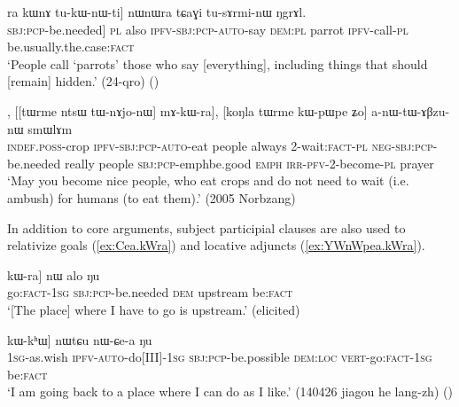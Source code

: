 \begin{exe}
\ex \label{ex:kAnWtsW.kWra}
\gll [kɤ-nɯtsɯ kɯ-ra] ra kɯnɤ tu-kɯ-nɯ-ti] nɯnɯra tɕaɣi tu-sɤrmi-nɯ ŋgrɤl. \\
[[[\textsc{inf}-hide] \textsc{sbj}:\textsc{pcp}-be.needed] \textsc{pl} also \textsc{ipfv}-\textsc{sbj}:\textsc{pcp}-\textsc{auto}-say \textsc{dem}:\textsc{pl} parrot \textsc{ipfv}-call-\textsc{pl} be.usually.the.case:\textsc{fact} \\
\glt `People call `parrots' those who say [everything], including things that should [remain] hidden.' (24-qro)
()
\end{exe}

\begin{exe}
\ex \label{ex:tWnAjonW.kWra}
, [[tɯrme ntsɯ tɯ-nɤjo-nɯ] mɤ-kɯ-ra], [koŋla tɯrme kɯ-pɯ\redp{}pe ʑo] a-nɯ-tɯ-ɤβzu-nɯ smɯlɤm \\
\textsc{indef}.\textsc{poss}-crop \textsc{ipfv}-\textsc{sbj}:\textsc{pcp}-\textsc{auto}-eat people always 2-wait:\textsc{fact}-\textsc{pl} \textsc{neg}-\textsc{sbj}:\textsc{pcp}-be.needed really people \textsc{sbj}:\textsc{pcp}-emph\redp{}be.good \textsc{emph} \textsc{irr}-\textsc{pfv}-2-become-\textsc{pl} prayer \\
\glt `May you become nice people, who eat crops and do not need to wait (i.e. ambush) for humans (to eat them).' (2005 Norbzang)
\end{exe}

In addition to core arguments, subject participial clauses are also used to relativize goals (\ref{ex:Cea.kWra}) and locative adjuncts (\ref{ex:YWnWpea.kWra}).
 
\begin{exe}
\ex \label{ex:Cea.kWra}
\gll [[ɕe-a] kɯ-ra] nɯ alo ŋu \\
go:\textsc{fact}-\textsc{1sg} \textsc{sbj}:\textsc{pcp}-be.needed \textsc{dem} upstream be:\textsc{fact} \\
\glt  `[The place] where I have to go is upstream.' (elicited)
\end{exe}

\begin{exe}
\ex \label{ex:YWnWpea.kWra}
\gll [[aʑo-sɯso ɲɯ-nɯ-pe-a] kɯ-kʰɯ] nɯtɕu nɯ-ɕe-a ŋu \\
\textsc{1sg}-as.wish \textsc{ipfv}-\textsc{auto}-do[III]-\textsc{1sg} \textsc{sbj}:\textsc{pcp}-be.possible \textsc{dem}:\textsc{loc} \textsc{vert}-go:\textsc{fact}-\textsc{1sg} be:\textsc{fact} \\
\glt  `I am going back to a place where I can do as I like.' (140426 jiagou he lang-zh)
()
\end{exe}

